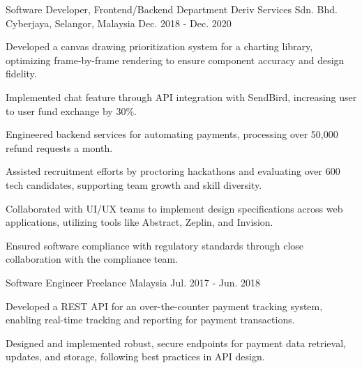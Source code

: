 \begin{cventries}
  \cventry
    {Software Developer, Frontend/Backend Department} %
    {Deriv Services Sdn. Bhd.} %
    {Cyberjaya, Selangor, Malaysia} %
    {Dec. 2018 - Dec. 2020} %
    {
      \begin{cvitems} %
        \item {Developed a canvas drawing prioritization system for a charting library, optimizing frame-by-frame rendering to ensure component accuracy and design fidelity.}
        \item {Implemented chat feature through API integration with SendBird, increasing user to user fund exchange by 30\%.}
        \item {Engineered backend services for automating payments, processing over 50,000 refund requests a month.}
        \item {Assisted recruitment efforts by proctoring hackathons and evaluating over 600 tech candidates, supporting team growth and skill diversity.}
        \item {Collaborated with UI/UX teams to implement design specifications across web applications, utilizing tools like Abstract, Zeplin, and Invision.}
        \item {Ensured software compliance with regulatory standards through close collaboration with the compliance team.}
      \end{cvitems}
    }

  \cventry
    {Software Engineer} %
    {Freelance} %
    {Malaysia} %
    {Jul. 2017 - Jun. 2018} %
    {
      \begin{cvitems} %
        \item {Developed a REST API for an over-the-counter payment tracking system, enabling real-time tracking and reporting for payment transactions.}
        \item {Designed and implemented robust, secure endpoints for payment data retrieval, updates, and storage, following best practices in API design.}
      \end{cvitems}
    }
\end{cventries}
